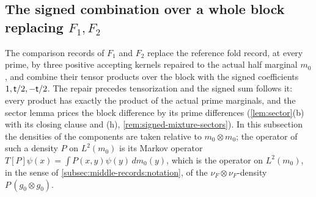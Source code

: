 \subsection{The signed combination over a whole block replacing \texorpdfstring{$F_1,F_2$}{F\_1,F\_2}}\label{subsec:oct24:pure-local}

The comparison records of $F_1$ and $F_2$ replace the reference fold record,
at every prime, by three positive accepting kernels repaired to the actual
half marginal $m_0$, and combine their tensor products over the block with the
signed coefficients $1,\mathsf t/2,-\mathsf t/2$. The repair precedes tensorization and
the signed sum follows it: every product has exactly the product of the actual
prime marginals, and the sector lemma prices the block difference by its prime
differences (\cref{lem:sector}(b) with its closing clause and (h),
\cref{rem:signed-mixture-sectors}). In this subsection the densities of the
components are taken relative to $m_0\otimes m_0$; the operator of such a
density $P$ on $L^2(m_0)$ is its Markov operator
$T[P]\psi(x)=\int P(x,y)\psi(y)\,dm_0(y)$, which is the operator on $L^2(m_0)$,
in the sense of \cref{subsec:middle-records:notation}, of the
$\nu_F\otimes\nu_F$-density $P\,(g_0\otimes g_0)$.

